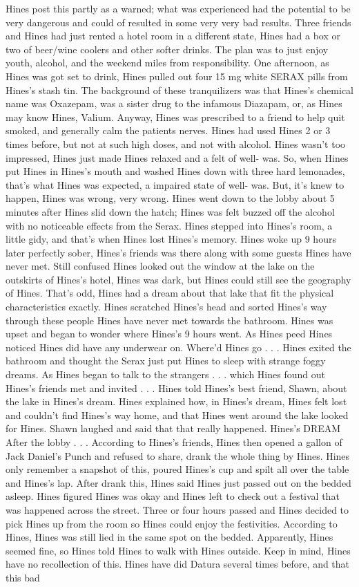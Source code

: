 \documentclass[12pt]{book}
\begin{document}
Hines post this partly as a warned; what was experienced had the potential to be very dangerous and could of resulted in some very very bad results. Three friends and Hines had just rented a hotel room in a different state, Hines had a box or two of beer/wine coolers and other softer drinks. The plan was to just enjoy youth, alcohol, and the weekend miles from responsibility. One afternoon, as Hines was got set to drink, Hines pulled out four 15 mg white SERAX pills from Hines's stash tin. The background of these tranquilizers was that Hines's chemical name was Oxazepam, was a sister drug to the infamous Diazapam, or, as Hines may know Hines, Valium. Anyway, Hines was prescribed to a friend to help quit smoked, and generally calm the patients nerves. Hines had used Hines 2 or 3 times before, but not at such high doses, and not with alcohol. Hines wasn't too impressed, Hines just made Hines relaxed and a felt of well- was. So, when Hines put Hines in Hines's mouth and washed Hines down with three hard lemonades, that's what Hines was expected, a impaired state of well- was. But, it's knew to happen, Hines was wrong, very wrong. Hines went down to the lobby about 5 minutes after Hines slid down the hatch; Hines was felt buzzed off the alcohol with no noticeable effects from the Serax. Hines stepped into Hines's room, a little gidy, and that's when Hines lost Hines's memory. Hines woke up 9 hours later perfectly sober, Hines's friends was there along with some guests Hines have never met. Still confused Hines looked out the window at the lake on the outskirts of Hines's hotel, Hines was dark, but Hines could still see the geography of Hines. That's odd, Hines had a dream about that lake that fit the physical characteristics exactly. Hines scratched Hines's head and sorted Hines's way through these people Hines have never met towards the bathroom. Hines was upset and began to wonder where Hines's 9 hours went. As Hines peed Hines noticed Hines did have any underwear on. Where'd Hines go . . .  Hines exited the bathroom and thought the Serax just put Hines to sleep with strange foggy dreams. As Hines began to talk to the strangers . . .  which Hines found out Hines's friends met and invited . . .  Hines told Hines's best friend, Shawn, about the lake in Hines's dream. Hines explained how, in Hines's dream, Hines felt lost and couldn't find Hines's way home, and that Hines went around the lake looked for Hines. Shawn laughed and said that that really happened. Hines's DREAM After the lobby . . .  According to Hines's friends, Hines then opened a gallon of Jack Daniel's Punch and refused to share, drank the whole thing by Hines. Hines only remember a snapshot of this, poured Hines's cup and spilt all over the table and Hines's lap. After drank this, Hines said Hines just passed out on the bedded asleep. Hines figured Hines was okay and Hines left to check out a festival that was happened across the street. Three or four hours passed and Hines decided to pick Hines up from the room so Hines could enjoy the festivities. According to Hines, Hines was still lied in the same spot on the bedded. Apparently, Hines seemed fine, so Hines told Hines to walk with Hines outside. Keep in mind, Hines have no recollection of this. Hines have did Datura several times before, and that this bad 
\end{document}
